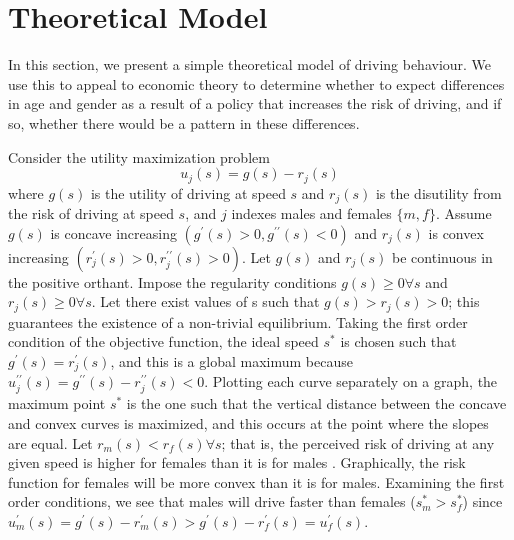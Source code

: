 \section{Theoretical Model}
\label{sec:Model}

In this section, we present a simple theoretical model of driving behaviour. We use this to appeal to economic theory to determine whether to expect differences in age and gender as a result of a policy that increases the risk of driving, and if so, whether there would be a pattern in these differences. 

Consider the utility maximization problem
%
\begin{equation}
	u_j (s) = g(s) - r_j (s)
\end{equation}
% 
where $g(s)$ is the utility of driving at speed $s$ and $r_j (s)$ is the disutility from the risk of driving at speed $s$, and $j$ indexes males and females $\{m,f\}$. Assume $g(s)$ is concave increasing $(g^{\prime} (s)>0, g^{\prime\prime} (s)<0)$ and $r_j (s)$ is convex increasing $(r_j^{\prime} (s)>0, r_j^{\prime\prime} (s)>0)$. Let $g(s)$ and $r_j (s)$ be continuous in the positive orthant. Impose the regularity conditions $g(s)\geq0 \forall s$ and $r_j (s)\geq0 \forall s$. Let there exist values of s such that $g(s)>r_j (s)>0$; this guarantees the existence of a non-trivial equilibrium. Taking the first order condition of the objective function, the ideal speed $s^*$ is chosen such that $g^{\prime} (s)=r_j^{\prime} (s)$, and this is a global maximum because $u_j^{\prime\prime} (s)=g^{\prime\prime} (s)-r_j^{\prime\prime} (s)<0$. Plotting each curve separately on a graph, the maximum point $s^*$ is the one such that the vertical distance between the concave and convex curves is maximized, and this occurs at the point where the slopes are equal. Let $r_m (s)<r_f (s)  \forall s$; that is, the perceived risk of driving at any given speed is higher for females than it is for males 
\citep{crosongneezy2009}.
Graphically, the risk function for females will be more convex than it is for males. Examining the first order conditions, we see that males will drive faster than females ($s_m^*>s_f^*$) since $u_m^{\prime} (s)=g^{\prime} (s)-r_m^{\prime} (s)>g^{\prime} (s)-r_f^{\prime} (s)=u_f^{\prime} (s)$. \\



